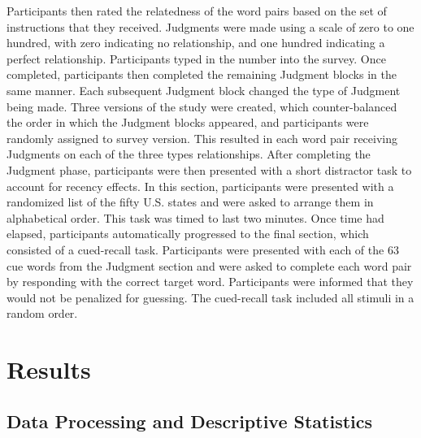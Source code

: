 \documentclass[english,man]{apa6}
\theoremstyle{definition}
\theoremstyle{definition}
\theoremstyle{remark}
\begin{document}
Participants then rated the relatedness of the word pairs based on the
set of instructions that they received. Judgments were made using a
scale of zero to one hundred, with zero indicating no relationship, and
one hundred indicating a perfect relationship. Participants typed in the
number into the survey. Once completed, participants then completed the
remaining Judgment blocks in the same manner. Each subsequent Judgment
block changed the type of Judgment being made. Three versions of the
study were created, which counter-balanced the order in which the
Judgment blocks appeared, and participants were randomly assigned to
survey version. This resulted in each word pair receiving Judgments on
each of the three types relationships. After completing the Judgment
phase, participants were then presented with a short distractor task to
account for recency effects. In this section, participants were
presented with a randomized list of the fifty U.S. states and were asked
to arrange them in alphabetical order. This task was timed to last two
minutes. Once time had elapsed, participants automatically progressed to
the final section, which consisted of a cued-recall task. Participants
were presented with each of the 63 cue words from the Judgment section
and were asked to complete each word pair by responding with the correct
target word. Participants were informed that they would not be penalized
for guessing. The cued-recall task included all stimuli in a random
order.

\section{Results}\label{results}

\subsection{Data Processing and Descriptive
Statistics}\label{data-processing-and-descriptive-statistics}
\end{document}
